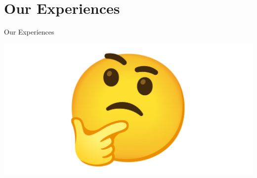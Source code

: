 \documentclass{beamer}
\begin{document}
\section{Our Experiences}
\begin{frame}{Our Experiences}
\begin{center}
    \includegraphics[width=1.0\textwidth]{emoji.jpg}
  \end{center}
  \vspace{1ex}
  \centering
\end{frame}
\end{document}
